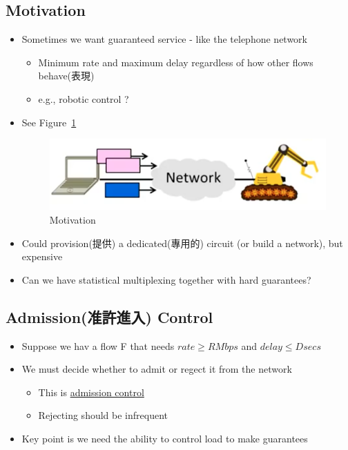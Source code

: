 \documentclass[12pt]{ctexart}   %
\begin{document}
	\subsection{Motivation}
	\begin{itemize}
		\item Sometimes we want guaranteed service - like the telephone network
		\begin{itemize}
			\item Minimum rate and maximum delay regardless of how other flows behave(表現)
			\item e.g., robotic control ?
		\end{itemize}
		\item See Figure~\ref{fig:9-7-2}
		  
		\begin{figure}[h!] %
		\centering
		\includegraphics[scale=0.7]{images/9-7-2}
		\caption{ Motivation }
		\label{fig:9-7-2}
		\end{figure}

		\item Could provision(提供) a dedicated(專用的) circuit (or build a network), but expensive
		\item Can we have statistical multiplexing together with hard guarantees?
	\end{itemize}

	\subsection{Admission(准許進入) Control}
	\begin{itemize}
		\item Suppose we hav a flow F that needs $rate \geqslant R Mbps$ and $delay \leqslant D secs$
		\item We must decide whether to admit or regect it from the network
		\begin{itemize}
			\item This is \underline{admission control}
			\item Rejecting should be infrequent
		\end{itemize}

		\item  Key point is we need the ability to control load to make guarantees
	\end{itemize}
\end{document}
